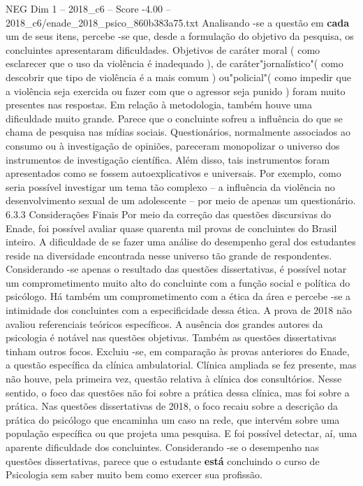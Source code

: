 \begin{textsample}{NEG Dim 1 – 2018\_c6 – Score -4.00 – 2018\_c6/enade\_2018\_psico\_860b383a75.txt}
Analisando -se a questão em \textbf{cada} um de seus itens, percebe -se que, desde a formulação do objetivo da pesquisa, os concluintes apresentaram dificuldades.
Objetivos de caráter moral ( como esclarecer que o uso da violência é inadequado ), de caráter"jornalístico"( como descobrir que tipo de violência é a mais comum ) ou"policial"( como impedir que a violência seja exercida ou fazer com que o agressor seja punido ) foram muito presentes nas respostas.
Em relação à metodologia, também houve uma dificuldade muito grande.
Parece que o concluinte sofreu a influência do que se chama de pesquisa nas mídias sociais.
Questionários, normalmente associados ao consumo ou à investigação de opiniões, pareceram monopolizar o universo dos instrumentos de investigação científica.
Além disso, tais instrumentos foram apresentados como se fossem autoexplicativos e universais.
Por exemplo, como seria possível investigar um tema tão complexo – a influência da violência no desenvolvimento sexual de um adolescente – por meio de apenas um questionário. 6.3.3 Considerações Finais Por meio da correção das questões discursivas do Enade, foi possível avaliar quase quarenta mil provas de concluintes do Brasil inteiro.
A dificuldade de se fazer uma análise do desempenho geral dos estudantes reside na diversidade encontrada nesse universo tão grande de respondentes.
Considerando -se apenas o resultado das questões dissertativas, é possível notar um comprometimento muito alto do concluinte com a função social e política do psicólogo.
Há também um comprometimento com a ética da área e percebe -se a intimidade dos concluintes com a especificidade dessa ética.
A prova de 2018 não avaliou referenciais teóricos específicos.
A ausência dos grandes autores da psicologia é notável nas questões objetivas.
Também as questões dissertativas tinham outros focos.
Excluiu -se, em comparação às provas anteriores do Enade, a questão específica da clínica ambulatorial.
Clínica ampliada se fez presente, mas não houve, pela primeira vez, questão relativa à clínica dos consultórios.
Nesse sentido, o foco das questões não foi sobre a prática dessa clínica, mas foi sobre a prática.
Nas questões dissertativas de 2018, o foco recaiu sobre a descrição da prática do psicólogo que encaminha um caso na rede, que intervém sobre uma população específica ou que projeta uma pesquisa.
E foi possível detectar, aí, uma aparente dificuldade dos concluintes.
Considerando -se o desempenho nas questões dissertativas, parece que o estudante \textbf{está} concluindo o curso de Psicologia sem saber muito bem como exercer sua profissão.

\end{textsample}
